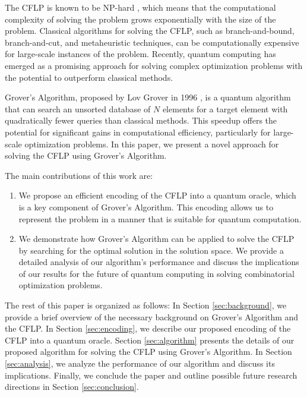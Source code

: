 The CFLP is known to be NP-hard \cite{np-hard}, which means that the computational complexity of solving the problem grows exponentially with the size of the problem. Classical algorithms for solving the CFLP, such as branch-and-bound, branch-and-cut, and metaheuristic techniques, can be computationally expensive for large-scale instances of the problem. Recently, quantum computing has emerged as a promising approach for solving complex optimization problems with the potential to outperform classical methods.

Grover's Algorithm, proposed by Lov Grover in 1996 \cite{grover}, is a quantum algorithm that can search an unsorted database of $N$ elements for a target element with quadratically fewer queries than classical methods. This speedup offers the potential for significant gains in computational efficiency, particularly for large-scale optimization problems. In this paper, we present a novel approach for solving the CFLP using Grover's Algorithm.

The main contributions of this work are:

\begin{enumerate}
    \item We propose an efficient encoding of the CFLP into a quantum oracle, which is a key component of Grover's Algorithm. This encoding allows us to represent the problem in a manner that is suitable for quantum computation.
    
    \item We demonstrate how Grover's Algorithm can be applied to solve the CFLP by searching for the optimal solution in the solution space. We provide a detailed analysis of our algorithm's performance and discuss the implications of our results for the future of quantum computing in solving combinatorial optimization problems.
\end{enumerate}

The rest of this paper is organized as follows: In Section \ref{sec:background}, we provide a brief overview of the necessary background on Grover's Algorithm and the CFLP. In Section \ref{sec:encoding}, we describe our proposed encoding of the CFLP into a quantum oracle. Section \ref{sec:algorithm} presents the details of our proposed algorithm for solving the CFLP using Grover's Algorithm. In Section \ref{sec:analysis}, we analyze the performance of our algorithm and discuss its implications. Finally, we conclude the paper and outline possible future research directions in Section \ref{sec:conclusion}.

